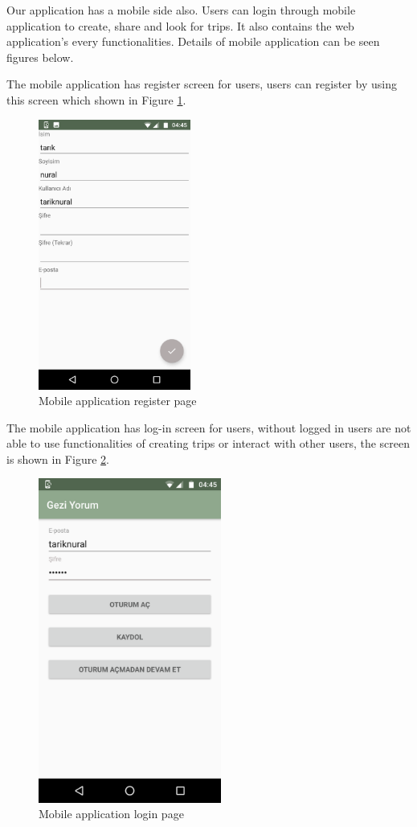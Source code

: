 Our application has a mobile side also. Users can login through mobile application to create, share and look for trips. It also contains the web application's every functionalities. Details of mobile application can be seen figures below.

The mobile application has register screen for users, users can register by using this screen which shown in Figure \ref{fig:phoneRegister}.

\begin{figure}[!htbp]
\centering
\includegraphics[width=50mm,scale=0.5]{projectChapters/images/phoneRegister.png}
\caption{Mobile application register page}
\label{fig:phoneRegister}
\end{figure}

\newpage

The mobile application has log-in screen for users, without logged in users are not able to use functionalities of creating trips or interact with other users, the screen is shown in Figure \ref{fig:phoneLogin}.  
\begin{figure}[!htbp]
\centering
\includegraphics[width=60mm,scale=0.6]{projectChapters/images/phoneLogin.png}
\caption{Mobile application login page}
\label{fig:phoneLogin}
\end{figure}

